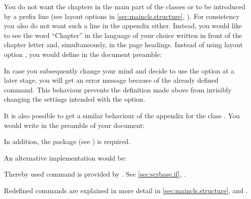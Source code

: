 \begin{Example}
  You do not want the chapters in the main part of the classes 
  or  to be introduced by a prefix line (see layout options
   in \autoref{sec:maincls.structure},
  ). For consistency you also
  do not want such a line in the appendix either. Instead, you would like to
  see the word ``Chapter'' in the language of your choice written in front of
  the chapter letter and, simultaneously, in the page headings.  Instead of
  using layout option , you would define in the
  document preamble:
%
\begin{lstcode}
  \newcommand*{\appendixmore}{%
    \renewcommand*{\chapterformat}{%
      \appendixname~\thechapter\autodot\enskip}
    \renewcommand*{\chaptermarkformat}{%
      \appendixname~\thechapter\autodot\enskip}
  }
\end{lstcode}
%  
  In case you subsequently change your mind and decide to use the option
   at a later stage, you will get an error message
  because of the already defined  command.  This behaviour
  prevents the definition made above from invisibly changing the settings
  intended with the option.
  
  It is also possible to get a similar behaviour of the appendix for
  the class . You would write in the preamble of your
  document:
\begin{lstcode}[moretexcs={ifthenelse,equal}]
  \newcommand*{\appendixmore}{%
    \renewcommand*{\othersectionlevelsformat}[3]{%
      \ifthenelse{\equal{##1}{section}}{%
        \appendixname~}{}%
      ##3\autodot\enskip}
    \renewcommand*{\sectionmarkformat}{%
      \appendixname~\thesection\autodot\enskip}}
\end{lstcode}
  In addition, the package  (see
  \cite{package:ifthen}) is required.

  An alternative implementation would be:
\begin{lstcode}
  \newcommand*{\appendixmore}{%
    \renewcommand*{\othersectionlevelsformat}[3]{%
      \ifstr{##1}{section}{\appendixname~}{}%
      ##3\autodot\enskip}
    \renewcommand*{\sectionmarkformat}{%
      \appendixname~\thesection\autodot\enskip}}
\end{lstcode}
  Thereby used command  is provided by
  \KOMAScript{}. See \autoref{sec:scrbase.if},
  .
  
  Redefined commands are explained in more detail in
  \autoref{sec:maincls.structure},
   and
  .
\end{Example}
%
%


